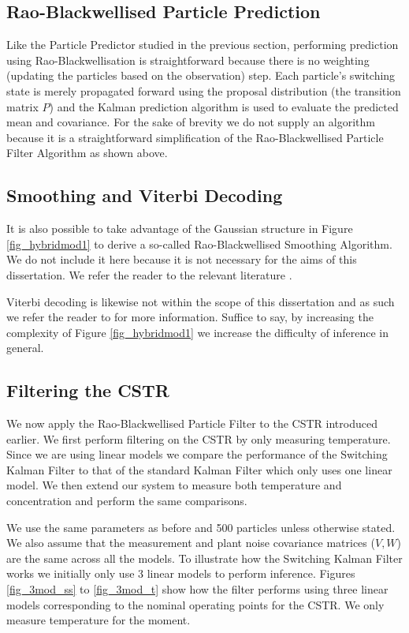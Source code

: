 \subsection{Rao-Blackwellised Particle Prediction}
Like the Particle Predictor studied in the previous section, performing prediction using Rao-Blackwellisation is straightforward because there is no weighting (updating the particles based on the observation) step. Each particle's switching state is merely propagated forward using the proposal distribution (the transition matrix $P$) and the Kalman prediction algorithm is used to evaluate the predicted mean and covariance. For the sake of brevity we do not supply an algorithm because it is a straightforward simplification of the Rao-Blackwellised Particle Filter Algorithm as shown above.

\subsection{Smoothing and Viterbi Decoding}
It is also possible to take advantage of the Gaussian structure in Figure \ref{fig_hybridmod1} to derive a so-called Rao-Blackwellised Smoothing Algorithm. We do not include it here because it is not necessary for the aims of this dissertation. We refer the reader to the relevant literature \cite{chen}\cite{doucet}. 

Viterbi decoding is likewise not within the scope of this dissertation and as such we refer the reader to \cite{murphy1} for more information. Suffice to say, by increasing the complexity of Figure \ref{fig_hybridmod1} we increase the difficulty of inference in general.

\subsection{Filtering the CSTR}
We now apply the Rao-Blackwellised Particle Filter to the CSTR introduced earlier. We first perform filtering on the CSTR by only measuring temperature. Since we are using linear models we compare the performance of the Switching Kalman Filter to that of the standard Kalman Filter which only uses one linear model. We then extend our system to measure both temperature and concentration and perform the same comparisons.

We use the same parameters as before and 500 particles unless otherwise stated. We also assume that the measurement and plant noise covariance matrices ($V,W$) are the same across all the models. To illustrate how the Switching Kalman Filter works we initially only use 3 linear models to perform inference. Figures \ref{fig_3mod_ss} to \ref{fig_3mod_t} show how  the filter performs using three linear models corresponding to the nominal operating points for the CSTR. We only measure temperature for the moment.

